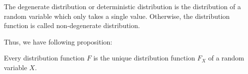 %
%
%
%
%
%
%
%
%
%
%
%
%

\begin{definition}
The degenerate distribution or deterministic distribution is the distribution of a random variable which only takes a single value. Otherwise, the distribution function is called non-degenerate distribution.
\end{definition}

Thus, we have following proposition:

\begin{proposition}
Every distribution function $F$ is the unique distribution function $F_X$ of a random variable $X$.
\end{proposition}

